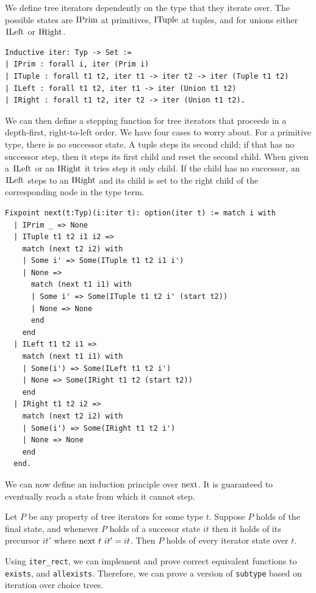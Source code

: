 \documentclass[a4paper,english]{lipics-v2019}
\renewcommand{\c}[1]{\ensuremath{\text{\lstinline{#1}}}\xspace}
\begin{document}
\noindent
We define tree iterators dependently on the type that they iterate over. The
possible states are \c{IPrim} at primitives, \c{ITuple} at tuples, and for
unions either \c{ILeft} or \c{IRight}.

\begin{lstlisting}
Inductive iter: Typ -> Set :=
| IPrim : forall i, iter (Prim i)
| ITuple : forall t1 t2, iter t1 -> iter t2 -> iter (Tuple t1 t2)
| ILeft : forall t1 t2, iter t1 -> iter (Union t1 t2)
| IRight : forall t1 t2, iter t2 -> iter (Union t1 t2).
\end{lstlisting}

We can then define a stepping function for tree iterators that proceeds in a
depth-first, right-to-left order.  We have four cases to worry about. For a
primitive type, there is no successor state. A tuple steps its second child;
if that has no successor step, then it steps its first child and reset the
second child. When given a \c{ILeft} or an \c{IRight} it tries step it only
child. If the child has no successor, an \c{ILeft} steps to an \c{IRight}
and its child is set to the right child of the corresponding node in the
type term.

\begin{lstlisting}
Fixpoint next(t:Typ)(i:iter t): option(iter t) := match i with
  | IPrim _ => None
  | ITuple t1 t2 i1 i2 =>
    match (next t2 i2) with
    | Some i' => Some(ITuple t1 t2 i1 i')
    | None =>
      match (next t1 i1) with
      | Some i' => Some(ITuple t1 t2 i' (start t2))
      | None => None
      end
    end
  | ILeft t1 t2 i1 =>
    match (next t1 i1) with
    | Some(i') => Some(ILeft t1 t2 i')
    | None => Some(IRight t1 t2 (start t2))
    end
  | IRight t1 t2 i2 => 
    match (next t2 i2) with
    | Some(i') => Some(IRight t1 t2 i')
    | None => None
    end
  end.
\end{lstlisting}

We can now define an induction principle over \c{next}. It is guaranteed to
eventually reach a state from which it cannot step.

\begin{theorem}
Let $P$ be any property of tree iterators for some type $t$.  Suppose $P$
holds of the final state, and whenever $P$ holds of a succesor state $it$
then it holds of its precursor $it'$ where $\c{next}~t~it' = it$.  Then $P$
holds of every iterator state over $t$.
\end{theorem} 


Using \verb|iter_rect|, we can implement and prove correct equivalent functions
to \verb|exists|, and \verb|allexists|. Therefore, we can prove a version of \verb|subtype|
based on iteration over choice trees.
\end{document}
